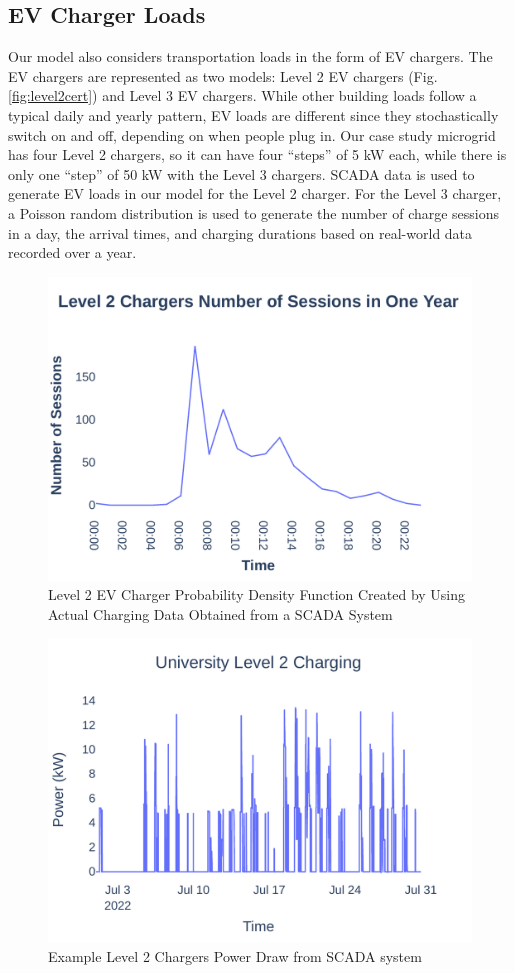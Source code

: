 \documentclass[conference,  usletter]{IEEEtran}
\begin{document}
\subsection{EV Charger Loads }
Our model also considers transportation loads in the form of EV chargers. The EV chargers are represented as two models: Level 2 EV chargers (Fig. \ref{fig:level2cert}) and Level 3 EV chargers. While other building loads follow a typical daily and yearly pattern, EV loads are different since they stochastically switch on and off, depending on when people plug in. Our case study microgrid has four Level 2 chargers, so it can have four ``steps'' of 5 kW each, while there is only one ``step'' of 50 kW with the Level 3 chargers. SCADA data is used to generate EV loads in our model for the Level 2 charger. For the Level 3 charger, a Poisson random distribution is used to generate the number of charge sessions in a day, the arrival times, and charging durations based on real-world data recorded over a year. 
\begin{figure}
\centering
\includegraphics[width=0.9\linewidth]{Fig/Option_3/l2_avg_day_rand_poisson_1_hour_real.pdf}
\caption{\footnotesize Level 2 EV Charger Probability Density Function  Created  by Using Actual Charging Data Obtained from a SCADA System}
\label{fig:l2avgdayrandpoisson1hourpdf}
\end{figure}
\begin{figure}
\centering
\includegraphics[width=0.9\linewidth]{Fig/Option_3/L2_short.pdf}
\caption{\footnotesize Example Level 2 Chargers Power Draw from SCADA system}
\label{fig:l2short}
\end{figure}
\end{document}
